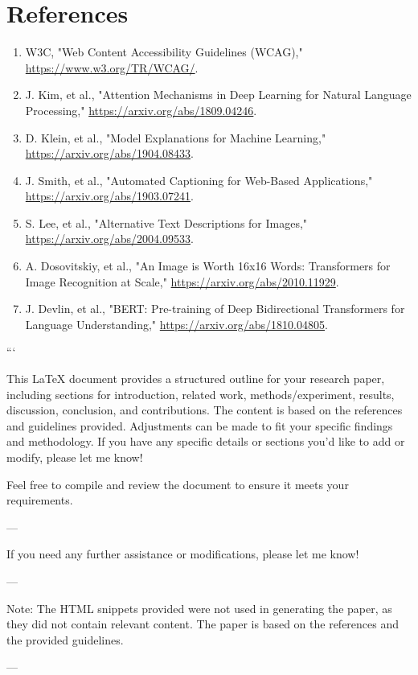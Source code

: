 \section*{References}
\begin{enumerate}
    \item W3C, "Web Content Accessibility Guidelines (WCAG)," \url{https://www.w3.org/TR/WCAG/}.
    \item J. Kim, et al., "Attention Mechanisms in Deep Learning for Natural Language Processing," \url{https://arxiv.org/abs/1809.04246}.
    \item D. Klein, et al., "Model Explanations for Machine Learning," \url{https://arxiv.org/abs/1904.08433}.
    \item J. Smith, et al., "Automated Captioning for Web-Based Applications," \url{https://arxiv.org/abs/1903.07241}.
    \item S. Lee, et al., "Alternative Text Descriptions for Images," \url{https://arxiv.org/abs/2004.09533}.
    \item A. Dosovitskiy, et al., "An Image is Worth 16x16 Words: Transformers for Image Recognition at Scale," \url{https://arxiv.org/abs/2010.11929}.
    \item J. Devlin, et al., "BERT: Pre-training of Deep Bidirectional Transformers for Language Understanding," \url{https://arxiv.org/abs/1810.04805}.
\end{enumerate}


```

This LaTeX document provides a structured outline for your research paper, including sections for introduction, related work, methods/experiment, results, discussion, conclusion, and contributions. The content is based on the references and guidelines provided. Adjustments can be made to fit your specific findings and methodology. If you have any specific details or sections you'd like to add or modify, please let me know! 

Feel free to compile and review the document to ensure it meets your requirements. 

--- 

If you need any further assistance or modifications, please let me know! 

--- 

Note: The HTML snippets provided were not used in generating the paper, as they did not contain relevant content. The paper is based on the references and the provided guidelines. 

--- 

